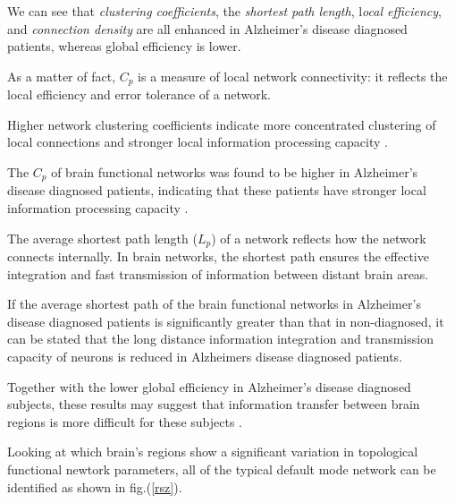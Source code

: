 \documentclass[12pt,openright,twoside,a4paper]{book}
\begin{document}
\vspace{5mm}

We can see that \textit{clustering coefficients}, the \textit{shortest path length}, l\textit{ocal efficiency}, and \textit{connection density} are all enhanced in Alzheimer's disease diagnosed patients, whereas global efficiency is lower. 

As a matter of fact, $C_p$ is a measure of local network connectivity: it reflects the local efficiency and error tolerance of a network. 

Higher network clustering coefficients indicate more concentrated clustering of local connections and stronger local information processing capacity \cite{Rest-NTW}.

The $C_p$ of brain functional networks was found to be higher in Alzheimer's disease diagnosed patients, indicating that these patients have stronger local information processing capacity \cite{ssa}.

The average shortest path length ($L_p$) of a network reflects how the network connects internally. In brain networks, the shortest path ensures the effective integration and fast transmission of information between distant brain areas.
\vspace{5mm}

If the average shortest path of the brain functional networks in Alzheimer's disease diagnosed patients is significantly greater than that in non-diagnosed, it can be stated that the long distance information integration and transmission capacity of neurons is reduced in Alzheimers disease diagnosed patients.

Together with the lower global efficiency in Alzheimer's disease diagnosed subjects, these results may suggest that information transfer between brain regions is more difficult for these subjects \cite{ssa}.
\vspace{5mm}

Looking at which  brain's regions show a significant variation in topological functional newtork parameters, all of the typical default mode network can be identified as shown in fig.(\ref{rsz}).
\end{document}
